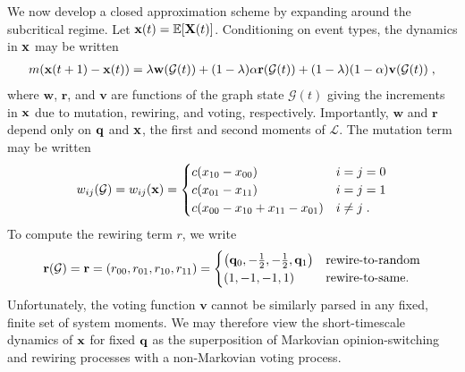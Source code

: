 \documentclass[review, onefignum, onetabnum]{siamart171218}
\begin{document}
    	We now develop a closed approximation scheme by expanding around the subcritical regime. 
    	Let $\mathbf{x}(t) = \mathbb{E}[\mathbf{X}(t)]$. 
    	Conditioning on event types, the dynamics in $\mathbf{x}$ may be written
    	\begin{align}
    		m(\x(t+1) - \x(t)) = \lambda \mathbf{w}(\mathcal{G}(t)) + (1-\lambda)\alpha \mathbf{r}(\mathcal{G}(t)) + (1-\lambda)(1-\alpha) \mathbf{v}(\mathcal{G}(t))\;, \label{eq:dynamics}
    	\end{align}
    	where $\mathbf{w}$, $\mathbf{r}$, and $\mathbf{v}$ are functions of the graph state $\mathcal{G}(t)$ giving the increments in $\mathbf{x}$ due to mutation, rewiring, and voting, respectively. 
    	Importantly, $\mathbf{w}$ and $\mathbf{r}$ depend only on $\mathbf{q}$ and $\mathbf{x}$, the first and second moments of $\mathcal{L}$. 
    	The mutation term may be written 
    	\begin{align*}
    		w_{ij}(\mathcal{G}) = w_{ij}(\mathbf{x}) = 
    		\begin{cases}
    			c(x_{10} - x_{00}) &  i = j = 0 \\ 
    			c (x_{01}-x_{11}) & i = j = 1 \\ 
    			c (x_{00}  - x_{10}+x_{11}-x_{01}) & i \neq j\;.
    		\end{cases}
    	\end{align*}
    	To compute the rewiring term $r$, we write 
    	\begin{align*}
    		\mathbf{r}(\mathcal{G}) = \mathbf{r}=(r_{00}, r_{01}, r_{10}, r_{11}) = 
    		\begin{cases}
    			\left(\mathbf{q}_0, -\frac{1}{2}, -\frac{1}{2}, \mathbf{q}_1\right) & \text{rewire-to-random}\\
    			\left(1, -1, -1, 1\right) & \text{rewire-to-same}.
    		\end{cases}
    	\end{align*}
    	Unfortunately, the voting function $\mathbf{v}$ cannot be similarly parsed in any fixed, finite set of system moments.  
    	We may therefore view the short-timescale dynamics of $\mathbf{x}$ for fixed $\mathbf{q}$ as the superposition of Markovian opinion-switching and rewiring processes with a non-Markovian voting process. 
	
\end{document}
